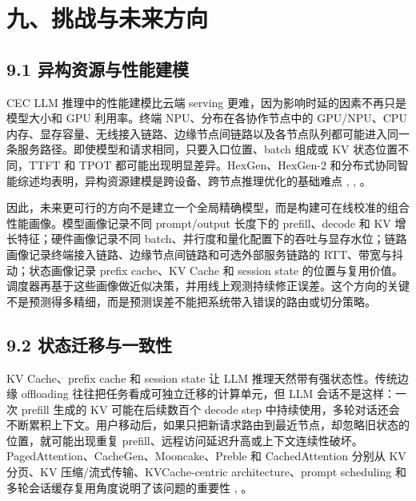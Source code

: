 \section*{九、挑战与未来方向}

\subsection*{9.1 异构资源与性能建模}

CEC LLM 推理中的性能建模比云端 serving 更难，因为影响时延的因素不再只是模型大小和 GPU 利用率。终端 NPU、分布在各协作节点中的 GPU/NPU、CPU 内存、显存容量、无线接入链路、边缘节点间链路以及各节点队列都可能进入同一条服务路径。即使模型和请求相同，只要入口位置、batch 组成或 KV 状态位置不同，TTFT 和 TPOT 都可能出现明显差异。HexGen、HexGen-2 和分布式协同智能综述均表明，异构资源建模是跨设备、跨节点推理优化的基础难点 \cite{jiang2023hexgen}, \cite{jiang2025hexgen}, \cite{duan2022distributed}。

因此，未来更可行的方向不是建立一个全局精确模型，而是构建可在线校准的组合性能画像。模型画像记录不同 prompt/output 长度下的 prefill、decode 和 KV 增长特征；硬件画像记录不同 batch、并行度和量化配置下的吞吐与显存水位；链路画像记录终端接入链路、边缘节点间链路和可选外部服务链路的 RTT、带宽与抖动；状态画像记录 prefix cache、KV Cache 和 session state 的位置与复用价值。调度器再基于这些画像做近似决策，并用线上观测持续修正误差。这个方向的关键不是预测得多精细，而是预测误差不能把系统带入错误的路由或切分策略。


\subsection*{9.2 状态迁移与一致性}

KV Cache、prefix cache 和 session state 让 LLM 推理天然带有强状态性。传统边缘 offloading 往往把任务看成可独立迁移的计算单元，但 LLM 会话不是这样：一次 prefill 生成的 KV 可能在后续数百个 decode step 中持续使用，多轮对话还会不断累积上下文。用户移动后，如果只把新请求路由到最近节点，却忽略旧状态的位置，就可能出现重复 prefill、远程访问延迟升高或上下文连续性破坏。PagedAttention、CacheGen、Mooncake、Preble 和 CachedAttention 分别从 KV 分页、KV 压缩/流式传输、KVCache-centric architecture、prompt scheduling 和多轮会话缓存复用角度说明了该问题的重要性 \cite{kwon2023efficient}, \cite{qin2025mooncake,liu2024cachegen,srivatsa2025preble,gao2024cost}。

